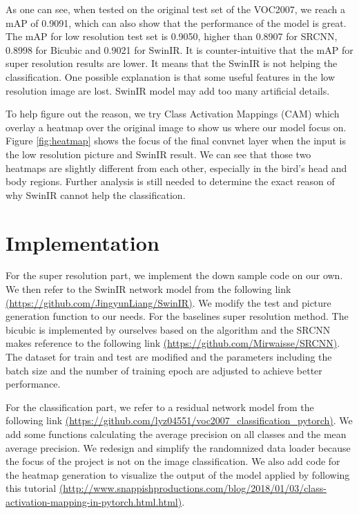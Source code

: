 \documentclass[10pt,twocolumn,letterpaper]{article}
\begin{document}
As one can see, when tested on the original test set of the VOC2007, we reach a mAP of 0.9091, which can also show that the performance of the model is great. The mAP for low resolution test set is 0.9050, higher than 0.8907 for SRCNN, 0.8998 for Bicubic and 0.9021 for SwinIR. It is counter-intuitive that the mAP for super resolution results are lower. It means that the SwinIR is not helping the classification. One possible explanation is that some useful features in the low resolution image are lost. SwinIR model may add too many artificial details. 

\par To help figure out the reason, we try Class Activation Mappings (CAM) which overlay a heatmap over the original image to show us where our model focus on. Figure \ref{fig:heatmap} shows the focus of the final convnet layer when the input is the low resolution picture and SwinIR result. We can see that those two heatmaps are slightly different from each other, especially in the bird's head and body regions. Further analysis is still needed to determine the exact reason of why SwinIR cannot help the classification.



\section{Implementation}
For the super resolution part, we implement the down sample code on our own. We then refer to the SwinIR network model from the following link \href{https://github.com/JingyunLiang/SwinIR}{(https://github.com/JingyunLiang/SwinIR)}. We modify the test and picture generation function to our needs. For the baselines super resolution method. The bicubic is implemented by ourselves based on the algorithm and the SRCNN makes reference to the following link \href{https://github.com/Mirwaisse/SRCNN}{(https://github.com/Mirwaisse/SRCNN)}. The dataset for train and test are modified and the parameters including the batch size and the number of training epoch are adjusted to achieve better performance. \par
For the classification part, we refer to a residual network model from the following link \href{https://github.com/lyz04551/voc2007_classification_pytorch}{(https://github.com/lyz04551/voc2007{\_}classification{\_}pytorch)}. We add some functions calculating the average precision on all classes and the mean average precision. We redesign and simplify the randomnized data loader because the focus of the project is not on the image classification. We also add code for the heatmap generation to visualize the output of the model applied by following this tutorial \href{http://www.snappishproductions.com/blog/2018/01/03/class-activation-mapping-in-pytorch.html.html}{(http://www.snappishproductions.com/blog/2018/01/03/class-activation-mapping-in-pytorch.html.html)}.

{\small


}
\end{document}
